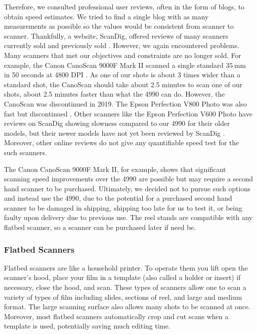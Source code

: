 \documentclass[12pt]{article} %
\begin{document}
Therefore, we consulted professional user reviews, often in the form of blogs, to obtain speed estimates. We tried to find a single blog with as many measurements as possible so the values would be consistent from scanner to scanner. Thankfully, a website, ScanDig, offered reviews of many scanners currently sold and previously sold \cite{ScanDig}. However, we again encountered problems. Many scanners that met our objectives and constraints are no longer sold. For example, the Canon CanoScan 9000F Mark II scanned a single standard $35 \ \text{mm}$ in 50 seconds at 4800 DPI \cite{canoscanspeed}. As one of our shots is about 3 times wider than a standard shot, the CanoScan should take about 2.5 minutes to scan one of our shots, about 2.5 minutes faster than what the 4990 can do. However, the CanoScan was discontinued in 2019. The Epson Perfection V800 Photo was also fast but discontinued \cite{v800scandig}. Other scanners like the Epson Perfection V600 Photo have reviews on ScanDig showing slowness compared to our 4990 for their older models, but their newer models have not yet been reviewed by ScanDig \cite{v600scandig}. Moreover, other online reviews do not give any quantifiable speed test for the such scanners.

The Canon CanoScan 9000F Mark II, for example, shows that significant scanning speed improvements over the 4990 are possible but may require a second hand scanner to be purchased. Ultimately, we decided not to pursue such options and instead use the 4990, due to the potential for a purchased second hand scanner to be damaged in shipping, shipping too late for us to test it, or being faulty upon delivery due to previous use. The reel stands are compatible with any flatbed scanner, so a scanner can be purchased later if need be.

\subsubsection{Flatbed Scanners}
Flatbed scanners are like a household printer. To operate them you lift open the scanner’s hood, place your film in a  template (also called a holder or insert) if necessary, close the hood, and scan. These types of scanners allow one to scan a variety of types of film including slides, sections of reel, and large and medium format. The large scanning surface also allows many shots to be scanned at once. Moreover, most flatbed scanners automatically crop and cut scans when a template is used, potentially saving much editing time.
\end{document}
